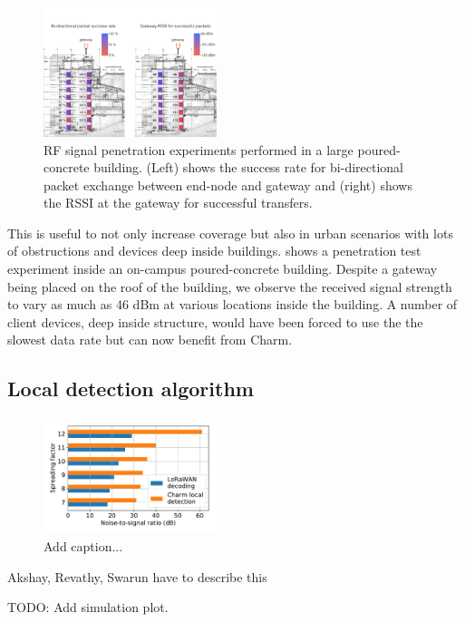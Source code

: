 \begin{figure}[!ht]
\centering
\includegraphics[width=0.45\textwidth]{figures/penetration_test_wean_cropped}
\compactimg
\caption{RF signal penetration experiments performed in a large poured-concrete building. (Left) shows the success rate for bi-directional packet exchange between end-node and gateway and (right) shows the RSSI at the gateway for successful transfers.}
\label{fig:penetration-test}
\end{figure}

This is useful to not only increase coverage but also in urban scenarios with lots of obstructions and devices deep inside buildings.  shows a penetration test experiment inside an on-campus poured-concrete building. Despite a gateway being placed on the roof of the building, we observe the received signal strength to vary as much as 46 dBm at various locations inside the building. A number of client devices, deep inside structure, would have been forced to use the the slowest data rate but can now benefit from Charm.

\subsection{Local detection algorithm}
\label{sec:local-detection-eval}

\begin{figure}[!ht]
\centering
\includegraphics[width=0.45\textwidth]{figures/local_detection_limits}
\caption{{\color{blue} Add caption...}}
\label{fig:local-detection}
\end{figure}

{\color{blue} Akshay, Revathy, Swarun have to describe this

TODO: Add simulation plot.}

